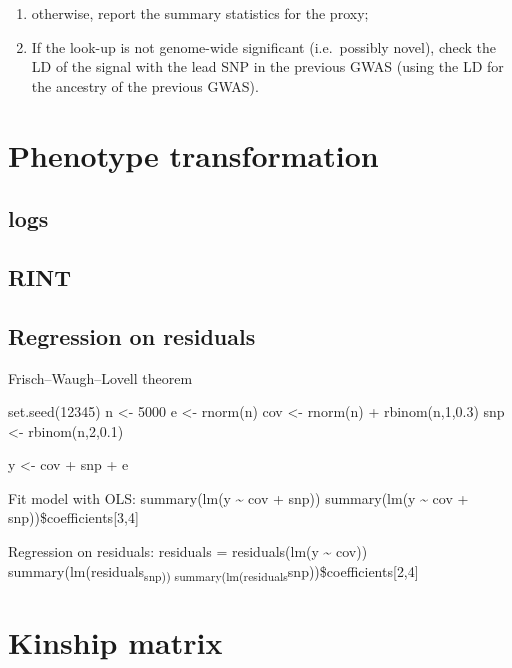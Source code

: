 \documentclass[
]{book}
\providecommand{\tightlist}{%
  \setlength{\itemsep}{0pt}\setlength{\parskip}{0pt}}
\begin{document}
\begin{enumerate}
\def\labelenumi{(\roman{enumi})}
\setcounter{enumi}{1}
\tightlist
\item
  otherwise, report the summary statistics for the proxy;
\item
  If the look-up is not genome-wide significant (i.e.~possibly novel), check the LD of the signal with the lead SNP in the previous GWAS (using the LD for the ancestry of the previous GWAS).
\end{enumerate}

\hypertarget{phenotype-transformation}{%
\section{Phenotype transformation}\label{phenotype-transformation}}

\hypertarget{logs}{%
\subsection{logs}\label{logs}}

\hypertarget{rint}{%
\subsection{RINT}\label{rint}}

\hypertarget{regression-on-residuals}{%
\subsection{Regression on residuals}\label{regression-on-residuals}}

Frisch--Waugh--Lovell theorem

set.seed(12345)
n \textless- 5000
e \textless- rnorm(n)
cov \textless- rnorm(n) + rbinom(n,1,0.3)
snp \textless- rbinom(n,2,0.1)

y \textless- cov + snp + e

Fit model with OLS:
summary(lm(y \textasciitilde{} cov + snp))
summary(lm(y \textasciitilde{} cov + snp))\$coefficients{[}3,4{]}

Regression on residuals:
residuals = residuals(lm(y \textasciitilde{} cov))
summary(lm(residuals\textsubscript{snp))
summary(lm(residuals}snp))\$coefficients{[}2,4{]}

\hypertarget{kinship-matrix}{%
\section{Kinship matrix}\label{kinship-matrix}}
\end{document}
